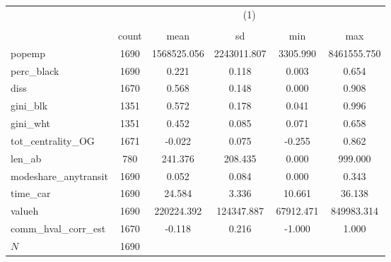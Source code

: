 {
\def\sym#1{\ifmmode^{#1}\else\(^{#1}\)\fi}
\begin{tabular}{l*{1}{ccccc}}
\toprule
            &\multicolumn{5}{c}{(1)}                                         \\
            &\multicolumn{5}{c}{}                                            \\
            &       count&        mean&          sd&         min&         max\\
\midrule
popemp      &        1690& 1568525.056& 2243011.807&    3305.990& 8461555.750\\
perc\_black  &        1690&       0.221&       0.118&       0.003&       0.654\\
diss        &        1670&       0.568&       0.148&       0.000&       0.908\\
gini\_blk    &        1351&       0.572&       0.178&       0.041&       0.996\\
gini\_wht    &        1351&       0.452&       0.085&       0.071&       0.658\\
tot\_centrality\_OG&        1671&      -0.022&       0.075&      -0.255&       0.862\\
len\_ab      &         780&     241.376&     208.435&       0.000&     999.000\\
modeshare\_anytransit&        1690&       0.052&       0.084&       0.000&       0.343\\
time\_car    &        1690&      24.584&       3.336&      10.661&      36.138\\
valueh      &        1690&  220224.392&  124347.887&   67912.471&  849983.314\\
comm\_hval\_corr\_est&        1670&      -0.118&       0.216&      -1.000&       1.000\\
\midrule
\(N\)       &        1690&            &            &            &            \\
\bottomrule
\end{tabular}
}

